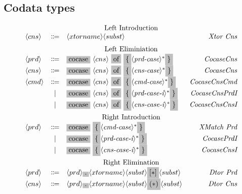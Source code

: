 \documentclass[11pt]{article}
\newcommand{\nonterminal}[1]{\langle #1 \rangle}
\newcommand{\terminal}[1]{\colorbox{lightgray}{#1}}
\begin{document}
\subsection{Codata types}
\[
  \begin{array}{lclr}
    \multicolumn{4}{c}{\text{Left Introduction}} \\
    \nonterminal{cns} & \Coloneqq & \nonterminal{xtorname}\nonterminal{subst} & \emph{Xtor Cns} \\[0.2cm]
    \multicolumn{4}{c}{\text{Left Eliminiation}} \\
    \nonterminal{prd} & \Coloneqq & \terminal{cocase}\ \nonterminal{cns}\ \terminal{of}\ \terminal{\{} \nonterminal{\textit{prd-case}}^{\ast} \terminal{\}} & \emph{CocaseCns} \\
    \nonterminal{cns} & \Coloneqq & \terminal{cocase}\ \nonterminal{cns}\ \terminal{of}\ \terminal{\{} \nonterminal{\textit{cns-case}}^{\ast} \terminal{\}} & \emph{CocaseCns} \\
    \nonterminal{cmd} & \Coloneqq & \terminal{cocase}\ \nonterminal{cns}\ \terminal{of}\ \terminal{\{} \nonterminal{\textit{cmd-case}}^{\ast} \terminal{\}} & \emph{CocaseCnsCmd} \\
    & | & \terminal{cocase}\ \nonterminal{cns}\ \terminal{of}\ \terminal{\{} \nonterminal{\textit{prd-case-i}}^{\ast} \terminal{\}} & \emph{CocaseCnsPrdI} \\
    & | & \terminal{cocase}\ \nonterminal{cns}\ \terminal{of}\ \terminal{\{} \nonterminal{\textit{cns-case-i}}^{\ast} \terminal{\}} & \emph{CocaseCnsCnsI} \\[0.2cm]
    \multicolumn{4}{c}{\text{Right Introduction}} \\
    \nonterminal{prd} & \Coloneqq & \terminal{cocase}\ \terminal{\{} \nonterminal{\textit{cmd-case}}^{\ast} \terminal{\}} & \emph{XMatch Prd} \\
    & | & \terminal{cocase}\ \terminal{\{} \nonterminal{\textit{prd-case-i}}^{\ast} \terminal{\}} & \emph{CocasePrdI} \\
    & | & \terminal{cocase}\ \terminal{\{} \nonterminal{\textit{cns-case-i}}^{\ast} \terminal{\}} & \emph{CocaseCnsI} \\[0.2cm]
    \multicolumn{4}{c}{\text{Right Elimination}} \\
    \nonterminal{prd} & \Coloneqq & \nonterminal{prd}\terminal{.}\nonterminal{xtorname}\nonterminal{subst}\terminal{$[\ast]$}\nonterminal{subst} & \emph{Dtor Prd} \\
    \nonterminal{cns} & \Coloneqq & \nonterminal{prd}\terminal{.}\nonterminal{xtorname}\nonterminal{subst}\terminal{$(\ast)$}\nonterminal{subst} & \emph{Dtor Cns} \\
  \end{array}
\]
\end{document}

